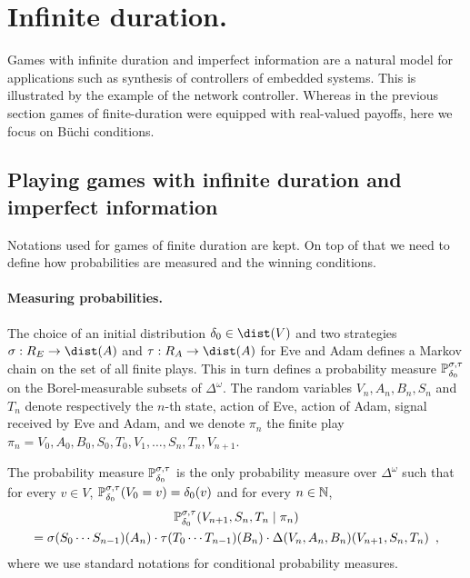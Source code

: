  
\section{Infinite duration.}


Games with infinite duration and imperfect information
are a natural model for applications such as synthesis 
of controllers of embedded systems.
This is illustrated by the example of the network controller.
Whereas in the previous section games of finite-duration
were equipped with real-valued payoffs, 
here we focus on B\"uchi conditions.


\subsection{Playing games with infinite duration and imperfect information }

Notations used for games of finite duration are kept.
On top of that we need to define how probabilities are measured
and the winning conditions.

\paragraph{Measuring probabilities.}
The choice of an initial distribution
$\ini\in\dist(V)$ 
and two strategies
$\sigma:  R_E \to \dist(A)$
and $\tau:  R_A \to \dist(A)$
for Eve and Adam
defines a Markov chain on the set of all finite plays.
This in turn defines a probability measure
$\mathbb{P}_{\delta_0}^{\sigma,\tau}$ on the Borel-measurable
subsets of $\Delta^\omega$.
The random variables $V_n,A_n,B_n,S_{n}$ and $T_{n}$ denote
respectively the $n$-th state, action of Eve, action of Adam, 
signal received by Eve and Adam,
and we denote $\pi_n$ the finite play 
$\pi_n = V_0,A_0,B_0,S_0,T_0,V_1,\ldots,S_{n},T_{n},V_{n+1}$.

The probability measure $\mathbb{P}_{\delta_0}^{\sigma,\tau}$ is the only
probability measure over $\Delta^\omega$ such that
for every $v\in V$, 
$\mathbb{P}^{\sigma,\tau}_{\delta_0}(V_0 = v) = \delta_0(v)$
and for every $n\in\mathbb{N}$,
\begin{multline*}
\mathbb{P}^{\sigma,\tau}_{\delta_0}(V_{n+1}, S_{n}, T_{n} \mid \pi_n) \\
= \sigma(S_0\cdots S_{n-1})(A_{n}) \cdot \tau(T_0\cdots T_{n-1})(B_n) \cdot \Delta(V_n,A_n,B_n)(V_{n+1},S_{n},T_{n})\enspace,
\end{multline*}
where we use standard notations for conditional probability measures.


